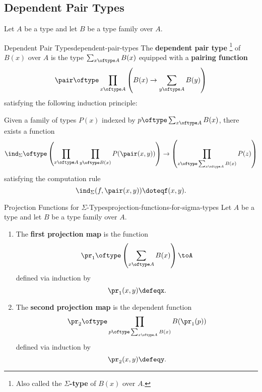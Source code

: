 \subsection{Dependent Pair Types}\label{subsection-dependent-pair-types}
Let $A$ be a type and let $B$ be a type family over $A$.
\begin{definition}{Dependent Pair Types}{dependent-pair-types}%
    The \textbf{dependent pair type}%
    \footnote{%
        Also called the \textbf{$\Sigma$-type} of $B(x)$ over $A$.
        \par\vspace*{\TCBBoxCorrection}
    } %
    of $B(x)$ over $A$ is the type $\sum_{x\oftype A}B(x)$ equipped with a \textbf{pairing function}
    \[
        \pair%
        \oftype%
        \prod_{x\oftype A}\left(B(x)\to\sum_{y\oftype A}B(y)\right)%
    \]%
    satisfying the following induction principle:
    \begin{itemize}
        \itemstar Given a family of types $P(x)$ indexed by $p\oftype\sum_{x\oftype A}B(x)$, there exists a function
            \[
                \ind_{\Sigma}%
                \oftype%
                \left(\prod_{x\oftype A}\prod_{y\oftype B(x)}P(\pair(x,y))\right)%
                \to%
                \left(\prod_{z\oftype\sum_{x\oftype A}B(x)}P(z)\right)%
            \]%
            satisfying the computation rule
            \[
                \ind_{\Sigma}(f,\pair(x,y))%
                \doteq%
                f(x,y).
            \]%
    \end{itemize}
\end{definition}
\begin{definition}{Projection Functions for $\Sigma$-Types}{projection-functions-for-sigma-types}%
    Let $A$ be a type and let $B$ be a type family over $A$.
    \begin{enumerate}
        \item\label{projection-functions-for-sigma-types-the-first-projection-map}The \textbf{first projection map} is the function
            \[
                \pr_{1}%
                \oftype%
                \left(\sum_{x\oftype A}B(x)\right)
                \to%
                A%
            \]%
            defined via induction by
            \[
                \pr_{1}(x,y)%
                \defeq%
                x.%
            \]%
        \item\label{projection-functions-for-sigma-types-the-second-projection-map}The \textbf{second projection map} is the dependent function
            \[
                \pr_{2}%
                \oftype%
                \prod_{p\oftype\sum_{x\oftype A}B(x)}B(\pr_{1}(p))%
            \]%
            defined via induction by
            \[
                \pr_{2}(x,y)%
                \defeq%
                y.%
            \]%
    \end{enumerate}
\end{definition}

